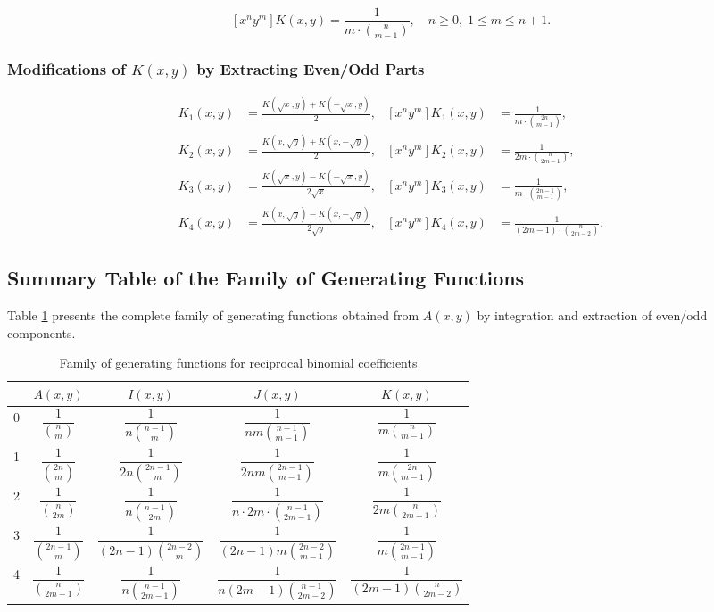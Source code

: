 \documentclass[12pt]{article}
\begin{document}
\[
[x^n y^m] K(x,y) = \frac{1}{m \cdot \binom{n}{m-1}}, \quad n \geq 0,\; 1 \leq m \leq n+1.
\]

\subsubsection{Modifications of \(K(x,y)\) by Extracting Even/Odd Parts}

\begin{align*}
K_1(x,y) &= \frac{K(\sqrt{x}, y) + K(-\sqrt{x}, y)}{2}, &
[x^n y^m] K_1(x,y) &= \frac{1}{m \cdot \binom{2n}{m-1}},\\
K_2(x,y) &= \frac{K(x, \sqrt{y}) + K(x, -\sqrt{y})}{2}, &
[x^n y^m] K_2(x,y) &= \frac{1}{2m \cdot \binom{n}{2m-1}},\\
K_3(x,y) &= \frac{K(\sqrt{x}, y) - K(-\sqrt{x}, y)}{2\sqrt{x}}, &
[x^n y^m] K_3(x,y) &= \frac{1}{m \cdot \binom{2n-1}{m-1}},\\
K_4(x,y) &= \frac{K(x, \sqrt{y}) - K(x, -\sqrt{y})}{2\sqrt{y}}, &
[x^n y^m] K_4(x,y) &= \frac{1}{(2m-1) \cdot \binom{n}{2m-2}}.
\end{align*}

\subsection{Summary Table of the Family of Generating Functions}

Table \ref{tabl1} presents the complete family of generating functions obtained from \(A(x,y)\) by integration and extraction of even/odd components.

\begin{table}[h]
\centering
\caption{Family of generating functions for reciprocal binomial coefficients}
\label{tabl1}
\begin{tabular}{|c|c|c|c|c|}
\hline
 & \(A(x,y)\) & \(I(x,y)\) & \(J(x,y)\) & \(K(x,y)\) \\
\hline
0 & \(\dfrac{1}{\binom{n}{m}}\) & \(\dfrac{1}{n\binom{n-1}{m}}\) & \(\dfrac{1}{n m \binom{n-1}{m-1}}\) & \(\dfrac{1}{m \binom{n}{m-1}}\) \\
\hline
1 & \(\dfrac{1}{\binom{2n}{m}}\) & \(\dfrac{1}{2n \binom{2n-1}{m}}\) & \(\dfrac{1}{2n m \binom{2n-1}{m-1}}\) & \(\dfrac{1}{m \binom{2n}{m-1}}\) \\
\hline
2 & \(\dfrac{1}{\binom{n}{2m}}\) & \(\dfrac{1}{n \binom{n-1}{2m}}\) & \(\dfrac{1}{n \cdot 2m \cdot \binom{n-1}{2m-1}}\) & \(\dfrac{1}{2m \binom{n}{2m-1}}\) \\
\hline
3 & \(\dfrac{1}{\binom{2n-1}{m}}\) & \(\dfrac{1}{(2n-1) \binom{2n-2}{m}}\) & \(\dfrac{1}{(2n-1) m \binom{2n-2}{m-1}}\) & \(\dfrac{1}{m \binom{2n-1}{m-1}}\) \\
\hline
4 & \(\dfrac{1}{\binom{n}{2m-1}}\) & \(\dfrac{1}{n \binom{n-1}{2m-1}}\) & \(\dfrac{1}{n (2m-1) \binom{n-1}{2m-2}}\) & \(\dfrac{1}{(2m-1) \binom{n}{2m-2}}\) \\
\hline
\end{tabular}
\end{table}
\end{document}
